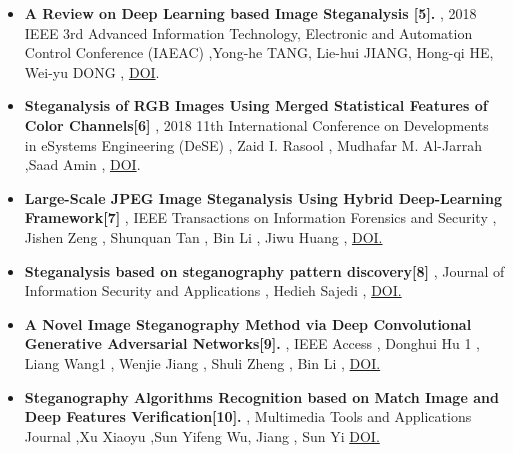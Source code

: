 \documentclass{beamer} %
\theoremstyle{definition} %
\begin{document}
\begin{itemize}
	\item {\textbf{A Review on Deep Learning based Image Steganalysis [5]. } ,  2018 IEEE 3rd Advanced Information Technology, Electronic and Automation Control Conference (IAEAC) ,Yong-he TANG, Lie-hui JIANG, Hong-qi HE, Wei-yu DONG , \href{http://doi. org/10. 1109/IAEAC. 2018. 8577655} {DOI}. }
\end{itemize}
\begin{itemize}
	\item {\textbf{Steganalysis of RGB Images Using Merged Statistical Features of Color Channels[6]} , 2018 11th International Conference on Developments in eSystems Engineering (DeSE) , Zaid I.  Rasool , Mudhafar M.  Al-Jarrah ,Saad Amin , \href{https://doi. org/10. 1109/DeSE. 2018. 00048}{DOI}. }
\end{itemize}
\begin{itemize}
	\item {\textbf{Large-Scale JPEG Image Steganalysis Using
			Hybrid Deep-Learning Framework[7]} ,  IEEE Transactions on Information Forensics and Security , Jishen Zeng  , Shunquan Tan  , Bin Li , Jiwu Huang , \href{https://doi. org/10. 1109/TIFS. 2017. 2779446}{DOI. } }
\end{itemize}
\begin{itemize}
    \item {\textbf{Steganalysis based on steganography pattern
    		discovery[8]} , Journal of Information Security and Applications , Hedieh Sajedi , \href{https://doi.org/10.1016/jjisa. 2016. 04. 001}{DOI. } }
\end{itemize}
\begin{itemize}
	\item{\textbf{A Novel Image Steganography Method via Deep Convolutional Generative Adversarial Networks[9]. }, IEEE Access , Donghui Hu 1 , Liang Wang1 , Wenjie Jiang , Shuli Zheng ,  Bin Li , \href{https://doi.org/10.1109/ACCESS.2018.2852771}{DOI. }}
\end{itemize}
\newpage
\begin{itemize}
     \item {\textbf{Steganography Algorithms Recognition based on Match
     Image and Deep Features Verification[10]. } , Multimedia Tools and Applications Journal ,Xu Xiaoyu ,Sun Yifeng Wu, Jiang , Sun Yi \href{https://doi.org/10.1007/s11042-018-6010-9}{DOI. }}
  
\end{itemize}
\end{document}
